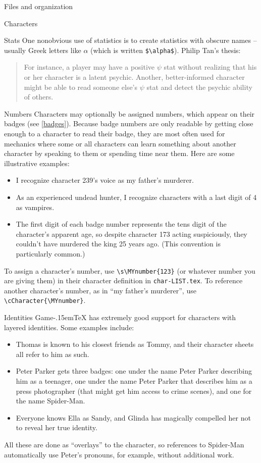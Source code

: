 \documentclass[11pt]{article}
\def\gametex{\mbox{Game\kern-.15em\TeX}}
\begin{document}
\begin{section}{Files and organization}
\begin{subsection}{Characters}
\begin{subsubsection}{Stats}
One nonobvious use of statistics is to create statistics with obscure names -- usually Greek letters like $\alpha$ (which is written \lstinline|$\alpha$|).  Philip Tan's thesis:
\begin{quote}
For instance, a player may have a positive $\psi$ stat without realizing that his
or her character is a latent psychic. Another, better-informed character might be able to
read someone else’s $\psi$ stat and detect the psychic ability of others.
\end{quote}
\end{subsubsection}
\begin{subsubsection}{Numbers}
Characters may optionally be assigned numbers, which appear on their badges (see \ref{badges}). Because badge numbers are only readable by getting close enough to a character to read their badge,
they are most often used for mechanics where some or all characters can learn something about another character by speaking to them or spending time near them.  Here are some illustrative examples:
\begin{itemize}
\item I recognize character 239's voice as my father's murderer.
\item As an experienced undead hunter, I recognize characters with a last digit of 4 as vampires.
\item The first digit of each badge number represents the tens digit of the character's apparent age, so despite character 173 acting suspiciously, they couldn't have murdered the king 25 years ago.  (This convention is particularly common.)
\end{itemize}
To assign a character's number, use \lstinline|\s\MYnumber{123}| (or whatever number you are giving them) in their character definition in \lstinline|char-LIST.tex|.
To reference another character's number, as in ``my father's murderer'', use \lstinline|\cCharacter{\MYnumber}|.
\end{subsubsection}
\begin{subsubsection}{Identities}
\label{identities}
\gametex{} has extremely good support for characters with layered identities.  Some examples include:
\begin{itemize}
\item Thomas is known to his closest friends as Tommy, and their character sheets all refer to him as such.
\item Peter Parker gets three badges: one under the name Peter Parker describing him as a teenager, one under the name Peter Parker that describes him as a press photographer (that might get him access to crime scenes), and one for the name Spider-Man.
\item Everyone knows Ella as Sandy, and Glinda has magically compelled her not to reveal her true identity.
\end{itemize}
All these are done as ``overlays'' to the character, so references to Spider-Man automatically use Peter's pronouns, for example, without additional work.


\end{subsubsection}
\end{subsection}
\end{section}
\end{document}
